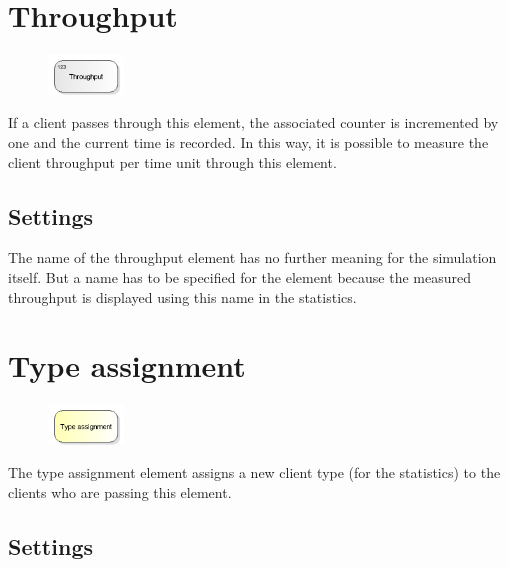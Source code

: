 \section{Throughput}
\label{ref:ModelElementThroughput}

\begin{figure}
\vspace{-22pt}
\includegraphics[width=2cm]{imageModelElementThroughput.png}
\vspace{-22pt}
\end{figure}

If a client passes through this element, the associated counter is incremented by one
and the current time is recorded. In this way, it is possible to measure the client
throughput per time unit through this element.

\subsection*{Settings}

The name of the throughput element has no further meaning for the simulation itself.
But a name has to be specified for the element because the measured throughput is
displayed using this name in the statistics.


\section{Type assignment}
\label{ref:ModelElementAssign}

\begin{figure}
\vspace{-22pt}
\includegraphics[width=2cm]{imageModelElementAssign.png}
\vspace{-22pt}
\end{figure}

The type assignment element assigns a new client type (for the statistics) to the clients who are passing this element.

\subsection*{Settings}

